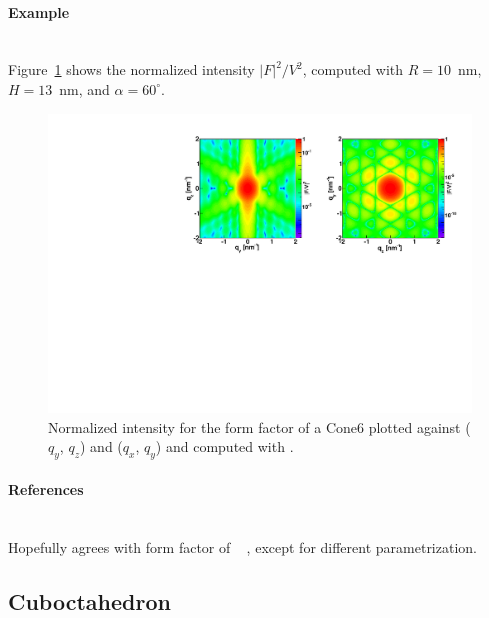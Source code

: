 \paragraph{Example}\strut\\
Figure~\ref{fig:FFCone6Ex} shows the normalized intensity
$|F|^2/V^2$, computed with $R=10$~nm, $H=13$~nm, and
$\alpha=60^{\circ}$.

\begin{figure}[H]
\begin{center}
\includegraphics[angle=-90,width=\textwidth]{fig/ff/figffcone6.pdf}
\end{center}
\caption{Normalized intensity for the form factor of a Cone6 plotted against ($q_y$, $q_z$) and ($q_x$, $q_y$) and computed with .}
\label{fig:FFCone6Ex}
\end{figure}

\paragraph{References}\strut\\
Hopefully agrees with  form factor of \IsGISAXS\
\cite[Eq.~2.32]{Laz08} \cite[Eq.~222]{ReLL09},
except for different parametrization.

\clearpage
\subsection{Cuboctahedron} \label{sec:Cuboctahedron}

